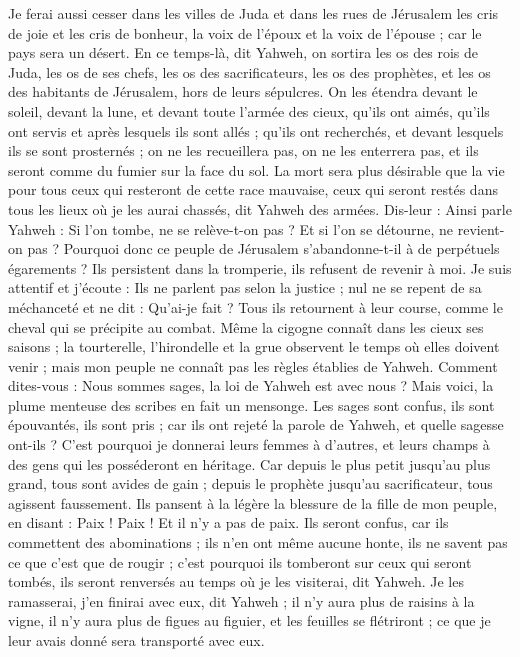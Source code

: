 \begin{multicols}{2}
Je ferai aussi cesser dans les villes de Juda et dans les rues de Jérusalem les cris de joie et les cris de bonheur, la voix de l'époux et la voix de l'épouse ; car le pays sera un désert.
\VerseOne{}En ce temps-là, dit Yahweh, on sortira les os des rois de Juda, les os de ses chefs, les os des sacrificateurs, les os des prophètes, et les os des habitants de Jérusalem, hors de leurs sépulcres.
On les étendra devant le soleil, devant la lune, et devant toute l'armée des cieux, qu'ils ont aimés, qu'ils ont servis et après lesquels ils sont allés ; qu'ils ont recherchés, et devant lesquels ils se sont prosternés ; on ne les recueillera pas, on ne les enterrera pas, et ils seront comme du fumier sur la face du sol.
La mort sera plus désirable que la vie pour tous ceux qui resteront de cette race mauvaise, ceux qui seront restés dans tous les lieux où je les aurai chassés, dit Yahweh des armées.
Dis-leur : Ainsi parle Yahweh : Si l'on tombe, ne se relève-t-on pas ? Et si l'on se détourne, ne revient-on pas ?
Pourquoi donc ce peuple de Jérusalem s'abandonne-t-il à de perpétuels égarements ? Ils persistent dans la tromperie, ils refusent de revenir à moi.
Je suis attentif et j'écoute : Ils ne parlent pas selon la justice ; nul ne se repent de sa méchanceté et ne dit : Qu'ai-je fait ? Tous ils retournent à leur course, comme le cheval qui se précipite au combat.
Même la cigogne connaît dans les cieux ses saisons ; la tourterelle, l'hirondelle et la grue observent le temps où elles doivent venir ; mais mon peuple ne connaît pas les règles établies de Yahweh.
Comment dites-vous : Nous sommes sages, la loi de Yahweh est avec nous ? Mais voici, la plume menteuse des scribes en fait un mensonge.
Les sages sont confus, ils sont épouvantés, ils sont pris ; car ils ont rejeté la parole de Yahweh, et quelle sagesse ont-ils ?
C'est pourquoi je donnerai leurs femmes à d'autres, et leurs champs à des gens qui les posséderont en héritage. Car depuis le plus petit jusqu'au plus grand, tous sont avides de gain ; depuis le prophète jusqu'au sacrificateur, tous agissent faussement.
Ils pansent à la légère la blessure de la fille de mon peuple, en disant : Paix ! Paix ! Et il n'y a pas de paix.
Ils seront confus, car ils commettent des abominations ; ils n'en ont même aucune honte, ils ne savent pas ce que c'est que de rougir ; c'est pourquoi ils tomberont sur ceux qui seront tombés, ils seront renversés au temps où je les visiterai, dit Yahweh.
Je les ramasserai, j'en finirai avec eux, dit Yahweh ; il n'y aura plus de raisins à la vigne, il n'y aura plus de figues au figuier, et les feuilles se flétriront ; ce que je leur avais donné sera transporté avec eux.

\end{multicols}
